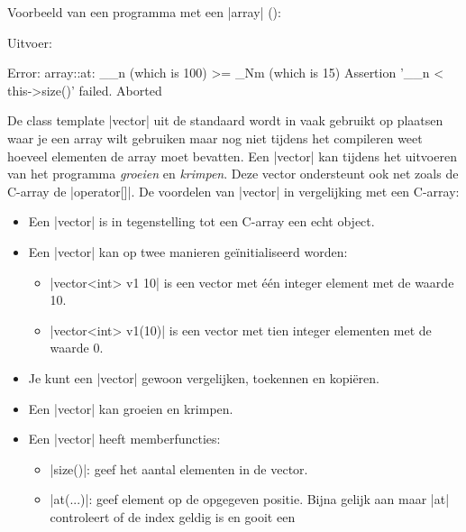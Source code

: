\begin{cpplstShortInline}
Voorbeeld van een programma met een |array| ():


Uitvoer:
\begin{coutput}
[0, 1, 4, 9, 16, 25, 36, 49, 64, 81, 100, 121, 144, 169, 196]
[0, 1, 4, 9, 16, 25, 36, 49, 64, 81, 100, 121, 144, 169, 196]
Error: array::at: __n (which is 100) >= _Nm (which is 15)
Assertion '__n < this->size()' failed.
Aborted
\end{coutput}


\label{std::vector}
De class template |vector| uit de standaard \Cpp{}  wordt in \Cpp{} vaak gebruikt op plaatsen waar je een array wilt gebruiken maar nog niet tijdens het compileren weet hoeveel elementen de array moet bevatten.
Een |vector| kan tijdens het uitvoeren van het programma \emph{groeien} en \emph{krimpen}. 
Deze vector ondersteunt ook net zoals de C\hyp{}array de |operator[]|.
De voordelen van |vector| in vergelijking met een C\hyp{}array:
\begin{itemize}
    \item Een |vector| is in tegenstelling tot een C\hyp{}array een echt object.
	\item Een |vector| kan op twee manieren geïnitialiseerd worden:
	\begin{itemize}
		\item 
		|vector<int> v1 {10}| is een vector met één integer element met de waarde 10.
		\item 
		|vector<int> v1(10)| is een vector met tien integer elementen met de waarde 0.
	\end{itemize}
    \item Je kunt een |vector| gewoon vergelijken, toekennen en kopiëren.
    \item Een |vector| kan groeien en krimpen.
    \item Een |vector| heeft memberfuncties:
    \begin{itemize}
        \item |size()|: geef het aantal elementen in de vector.
        \item |at(...)|: geef element op de opgegeven positie.
        Bijna gelijk aan  maar |at| controleert of de index geldig is en gooit een %

\end{itemize}
\end{itemize}
\end{cpplstShortInline}
